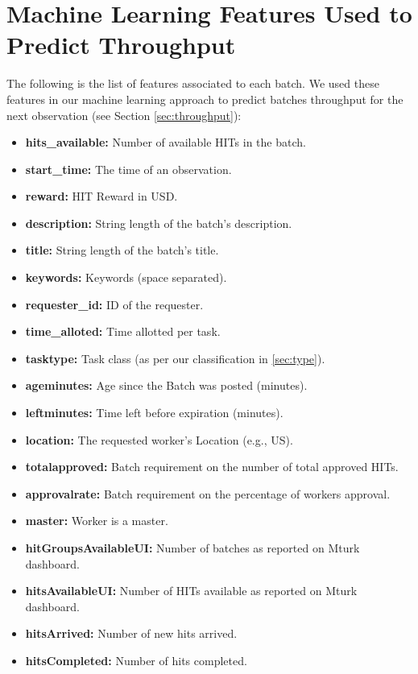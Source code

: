 \appendix

\label{ap:feats}
\section{Machine Learning Features Used to Predict Throughput}
The following is the list of features associated to each batch. We used these features in our machine learning approach to predict batches throughput for the next observation (see Section \ref{sec:throughput}):
\begin{itemize}[noitemsep]
\item \textbf{hits\_available:} Number of available HITs in the batch.
\item \textbf{start\_time:} The time of an observation.
\item \textbf{reward:} HIT Reward in USD.
\item \textbf{description:} String length of the batch's description.
\item \textbf{title:} String length of the batch's title.
\item \textbf{keywords:} Keywords (space separated).
\item \textbf{requester\_id:} ID of the requester.
\item \textbf{time\_alloted:} Time allotted per task.
\item \textbf{tasktype:} Task class (as per our classification in \ref{sec:type}).
\item \textbf{ageminutes:} Age since the Batch was posted (minutes).
\item \textbf{leftminutes:} Time left before expiration (minutes).
\item \textbf{location:} The requested worker's Location (e.g., US).
\item \textbf{totalapproved:} Batch requirement on the number of total approved HITs.
\item \textbf{approvalrate:} Batch requirement on the percentage of workers approval.
\item \textbf{master:} Worker is a master.
\item \textbf{hitGroupsAvailableUI:} Number of batches as reported on Mturk dashboard.
\item \textbf{hitsAvailableUI:} Number of HITs available as reported on Mturk dashboard.
\item \textbf{hitsArrived:} Number of new hits arrived.
\item \textbf{hitsCompleted:} Number of hits completed.

\end{itemize}
